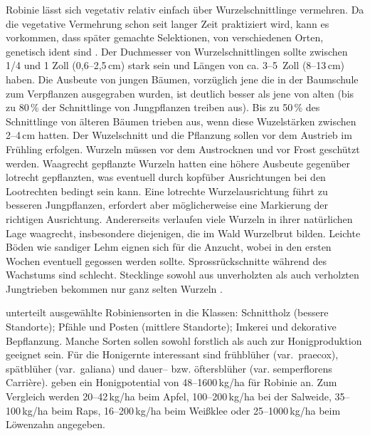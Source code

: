 \documentclass[twocolumn]{scrartcl}
\begin{document}
Robinie lässt sich vegetativ relativ einfach über Wurzelschnittlinge
vermehren. Da die vegetative Vermehrung schon seit langer Zeit
praktiziert wird, kann es vorkommen, dass später gemachte Selektionen,
von verschiedenen Orten, genetisch ident sind
\citep{liesebach2012robinie}. Der Duchmesser von Wurzelschnittlingen sollte zwischen 1/4
und 1 Zoll (0,6--2,5\,cm) stark sein und Längen von ca. 3--5~Zoll
(8--13\,cm) haben. Die Ausbeute von jungen Bäumen, vorzüglich jene die
in der Baumschule zum Verpflanzen ausgegraben wurden, ist deutlich
besser als jene von alten (bis zu 80\,\% der Schnittlinge von Jungpflanzen treiben aus).
Bis zu 50\,\% des Schnittlinge von älteren Bäumen trieben aus, wenn diese
Wuzelstärken zwischen 2--4\,cm hatten.
Der Wuzelschnitt und die Pflanzung sollen vor dem
Austrieb im Frühling erfolgen. Wurzeln müssen vor dem Austrocknen und
vor Frost geschützt werden. Waagrecht gepflanzte Wurzeln hatten eine
höhere Ausbeute gegenüber lotrecht gepflanzten, was eventuell durch
kopfüber Ausrichtungen bei den Lootrechten bedingt sein kann. Eine
lotrechte Wurzelausrichtung führt zu besseren Jungpflanzen, erfordert
aber möglicherweise eine Markierung der richtigen
Ausrichtung. Andererseits verlaufen viele Wurzeln in ihrer natürlichen
Lage waagrecht, insbesondere diejenigen, die im Wald Wurzelbrut bilden.
Leichte Böden wie sandiger Lehm
eignen sich für die Anzucht, wobei in den ersten Wochen eventuell
gegossen werden sollte. Sprossrückschnitte während des Wachstums sind
schlecht. Stecklinge sowohl aus unverholzten als auch verholzten
Jungtrieben bekommen nur ganz selten Wurzeln
\citep{swingle1937robinie}.

\citet{keresztesi1983robinie} unterteilt ausgewählte Robiniensorten in
die Klassen: Schnittholz (bessere Standorte); Pfähle und Posten
(mittlere Standorte); Imkerei und dekorative Bepflanzung. Manche
Sorten sollen sowohl forstlich als auch zur Honigproduktion geeignet
sein. Für die Honigernte interessant sind frühblüher (var.\ praecox),
spätblüher (var.\ galiana) und dauer-- bzw. öftersblüher
(var. semperflorens Carrière). \citet[S.~80]{crane1985honig} geben ein
Honigpotential von 48--1600\,kg/ha für Robinie an. Zum Vergleich werden
20--42\,kg/ha beim Apfel, 100--200\,kg/ha bei der Salweide,
35--100\,kg/ha beim Raps, 16--200\,kg/ha beim Weißklee oder
25--1000\,kg/ha beim Löwenzahn angegeben.
\end{document}
